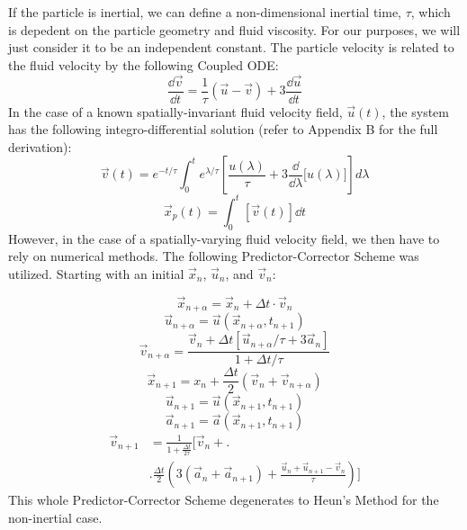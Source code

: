 \documentclass[10pt, reqno]{amsart}
\begin{document}
\begin{multicols}{2}
If the particle is inertial, we can define a non-dimensional inertial time, $\tau$, which is depedent on the particle geometry and fluid viscosity. For our purposes, we will just consider it to be an independent constant. The particle velocity is related to the fluid velocity by the following Coupled ODE:
\begin{equation}
    \frac{\dd \vec{v}}{\dd t} = \frac{1}{\tau} (\vec{u} - \vec{v}) + 3 \frac{\dd \vec{u}}{\dd t}
\end{equation}
In the case of a known spatially-invariant fluid velocity field, $\vec{u}(t)$, the system has the following integro-differential solution (refer to Appendix B for the full derivation):
\begin{equation}
    \vec{v}(t) = e^{-t/\tau} \int_0^t e^{\lambda/ \tau} \left[ \frac{u(\lambda)}{\tau}  + 3 \frac{\dd}{\dd \lambda} \Big[ u(\lambda) \Big] \right] d \lambda
\end{equation}
\begin{equation}
    \vec{x}_p(t) = \int_0^t [\vec{v}(t)] \dd t
\end{equation}
However, in the case of a spatially-varying fluid velocity field, we then have to rely on numerical methods. The following Predictor-Corrector Scheme was utilized. Starting with an initial $\vec{x}_n$, $\vec{u}_n$, and $\vec{v}_n$:

\begin{equation}
    \vec{x}_{n + \alpha} = \vec{x}_n + \Delta t \cdot \vec{v}_n
\end{equation}
\begin{equation}
    \vec{u}_{n + \alpha} = \vec{u}(\vec{x}_{n + \alpha}, t_{n + 1})
\end{equation}
\begin{equation}
    \vec{v}_{n + \alpha} = \frac{\vec{v}_n + \Delta t \left[ \vec{u}_{n + \alpha}/\tau + 3 \vec{a}_n \right]}{1 + \Delta t/\tau}
\end{equation}
\begin{equation}
    \vec{x}_{n+1} = x_n + \frac{\Delta t}{2} (\vec{v}_n + \vec{v}_{n + \alpha})
\end{equation}
\begin{equation}
    \vec{u}_{n+1} = \vec{u}( \vec{x}_{n+1}, t_{n+1} )
\end{equation}
\begin{equation}
    \vec{a}_{n+1} = \vec{a}( \vec{x}_{n+1}, t_{n+1} )
\end{equation}
\begin{equation}
    \begin{aligned}
    \vec{v}_{n+1} &= \frac{1}{1 + \frac{\Delta t}{2 \tau}} \Bigg[ \vec{v}_n + \Bigg. \\ 
    & \Bigg. \frac{\Delta t}{2} \left( 3 ( \vec{a}_n + \vec{a}_{n+1} ) + \frac{\vec{u}_n + \vec{u}_{n+1} - \vec{v}_n}{\tau} \right) \Bigg]
    \end{aligned}
\end{equation}
This whole Predictor-Corrector Scheme degenerates to Heun's Method for the non-inertial case.



\end{multicols}
\end{document}
